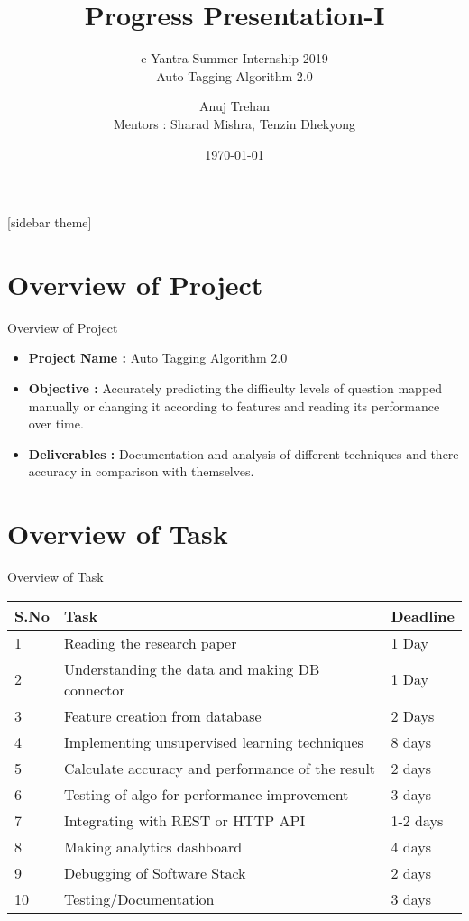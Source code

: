 \documentclass[10pt, a4paper]{beamer}
\begin{document}
	\title{Progress Presentation-I}
	\subtitle{e-Yantra Summer Internship-2019 \\ Auto Tagging Algorithm 2.0}
	\author{Anuj Trehan\\Mentors : Sharad Mishra, Tenzin Dhekyong}
	\date{\today}
	\frame{\titlepage}

[sidebar theme]
\section{Overview of Project}
\begin{frame}{Overview of Project}
	\begin{itemize}
		\item \textbf{Project Name :} Auto Tagging Algorithm 2.0
		\item \textbf{Objective :} Accurately predicting the difficulty levels of question mapped manually or changing it according to features and reading its performance over time.

		\item \textbf{Deliverables :} Documentation and analysis of different techniques and there accuracy in comparison with themselves.
	\end{itemize}
\end{frame}

\section{Overview of Task}
\begin{frame}{Overview of Task}
	\begin{tabular}{|l|l|l|}
		\hline
		S.No & Task & Deadline\\
		\hline
		1 & Reading the research paper & 1 Day \\
		\hline
		2 & Understanding the data and making DB connector & 1 Day  \\
		\hline
		3 & Feature creation from database & 2 Days \\
		\hline
		4 & Implementing unsupervised learning techniques & 8 days \\
		\hline
		5 & Calculate accuracy and performance of the result & 2 days\\
		\hline
		6 & Testing of algo for performance improvement & 3 days\\
		\hline
		7 & Integrating with REST or HTTP API & 1-2 days\\
		\hline
		8 & Making analytics dashboard & 4 days\\
		\hline
		9 & Debugging of Software Stack & 2 days\\
		\hline
		10 & Testing/Documentation & 3 days\\
		\hline
	\end{tabular}
\end{frame}
\end{document}
